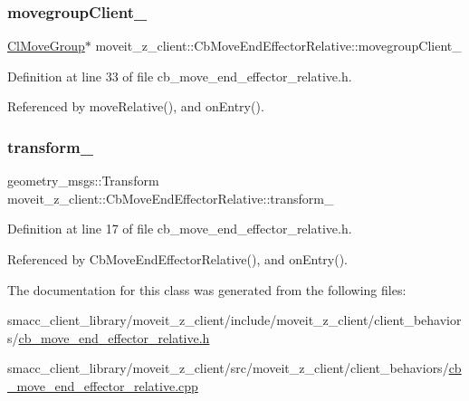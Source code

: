 \subsubsection{\texorpdfstring{movegroup\+Client\+\_\+}{movegroupClient\_}}
{\footnotesize\ttfamily \hyperlink{classmoveit__z__client_1_1ClMoveGroup}{Cl\+Move\+Group}$\ast$ moveit\+\_\+z\+\_\+client\+::\+Cb\+Move\+End\+Effector\+Relative\+::movegroup\+Client\+\_\+\hspace{0.3cm}{\ttfamily [protected]}}



Definition at line 33 of file cb\+\_\+move\+\_\+end\+\_\+effector\+\_\+relative.\+h.



Referenced by move\+Relative(), and on\+Entry().

\mbox{\label{classmoveit__z__client_1_1CbMoveEndEffectorRelative_a0686340d0328df4d0ecb962b61026f43}} 
\subsubsection{\texorpdfstring{transform\+\_\+}{transform\_}}
{\footnotesize\ttfamily geometry\+\_\+msgs\+::\+Transform moveit\+\_\+z\+\_\+client\+::\+Cb\+Move\+End\+Effector\+Relative\+::transform\+\_\+}



Definition at line 17 of file cb\+\_\+move\+\_\+end\+\_\+effector\+\_\+relative.\+h.



Referenced by Cb\+Move\+End\+Effector\+Relative(), and on\+Entry().



The documentation for this class was generated from the following files\+:\begin{DoxyCompactItemize}
\item 
smacc\+\_\+client\+\_\+library/moveit\+\_\+z\+\_\+client/include/moveit\+\_\+z\+\_\+client/client\+\_\+behaviors/\hyperlink{cb__move__end__effector__relative_8h}{cb\+\_\+move\+\_\+end\+\_\+effector\+\_\+relative.\+h}\item 
smacc\+\_\+client\+\_\+library/moveit\+\_\+z\+\_\+client/src/moveit\+\_\+z\+\_\+client/client\+\_\+behaviors/\hyperlink{cb__move__end__effector__relative_8cpp}{cb\+\_\+move\+\_\+end\+\_\+effector\+\_\+relative.\+cpp}\end{DoxyCompactItemize}
